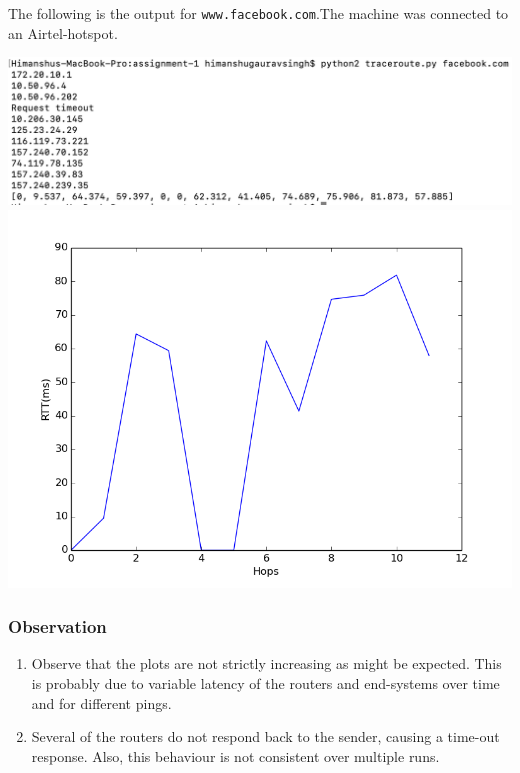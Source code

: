 \documentclass[a4paper]{article}
\begin{document}
The following is the output for \texttt{www.facebook.com}.The machine was connected to an Airtel-hotspot. \\
\begin{center}
\includegraphics[width=\textwidth,height=\textheight,keepaspectratio]{facebook.png}
\\
\includegraphics[width=\textwidth/2,height=\textheight/2,keepaspectratio]{traceroute_facebook.com.png}
\\
\end{center}

\subsubsection{Observation}
\begin{enumerate}
    \item Observe that the plots are not strictly increasing as might be expected. This is probably due to variable latency of the routers and end-systems over time and for different pings. 
    \item Several of the routers do not respond back to the sender, causing a time-out response. Also, this behaviour is not consistent over multiple runs. 
\end{enumerate}
\end{document}
